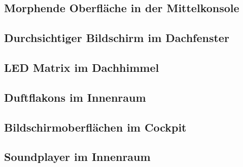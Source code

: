 \subsection{Morphende Oberfläche in der Mittelkonsole}
\subsection{Durchsichtiger Bildschirm im Dachfenster}
\subsection{LED Matrix im Dachhimmel}
\subsection{Duftflakons im Innenraum}
\subsection{Bildschirmoberflächen im Cockpit}
\subsection{Soundplayer im Innenraum}
